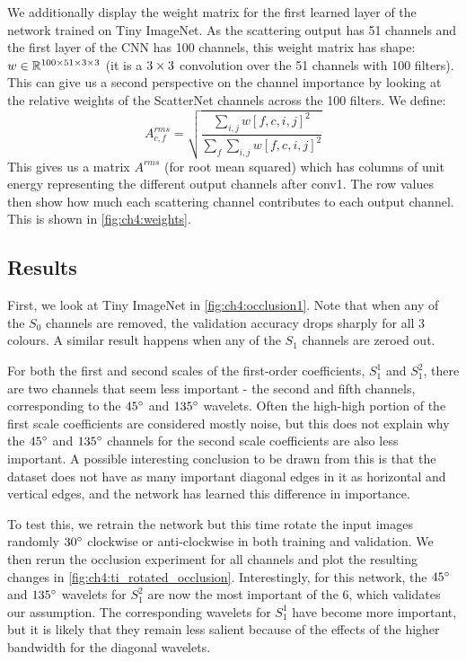We additionally display the weight matrix for the first learned layer of the
network trained on Tiny ImageNet. As the scattering output has 51 channels and
the first layer of the CNN has 100 channels, this weight matrix has shape:
$w\in \reals[100\x 51\x 3\x 3]$ (it is a $3\x 3$ convolution over the 51
channels with 100 filters). This can give us a second perspective on the
channel importance by looking at the relative weights of the ScatterNet channels
across the 100 filters. We define:
\begin{equation}\label{eq:ch4:arms}
  A^{rms}_{c, f} = \sqrt{ \frac{\sum_{i,j} w[f, c, i, j]^2}{{\sum_f \sum_{i,j} w[f, c, i, j]^2}} }
\end{equation}
This gives us a matrix $A^{rms}$ (for root mean squared) which has columns of
unit energy representing the different output channels after conv1. The row
values then show how much each scattering channel contributes to each output
channel. This is shown in \autoref{fig:ch4:weights}.

\subsection{Results}\label{sec:ch4:occlusion_results}
First, we look at Tiny ImageNet in \autoref{fig:ch4:occlusion1}.
Note that when any of the $S_0$ channels are removed, 
the validation accuracy drops sharply for all 3 colours. A similar result
happens when any of the $S_1$ channels are zeroed out. 

For both the first and second scales of the first-order coefficients, 
$S_1^1$ and $S_1^2$, there are two channels that seem less
important - the second and fifth channels, corresponding to the $45\degs$ and
$135\degs$ wavelets. Often the high-high portion of the first scale coefficients
are considered mostly noise, but this does not explain why the $45\degs$
and $135\degs$ channels for the second scale coefficients are also less
important. A possible interesting conclusion to be drawn from this is that the
dataset does not have as many important diagonal edges in it as horizontal and vertical
edges, and the network has learned this difference in importance. 

To test this, we retrain the network but this time rotate the input
images randomly $30\degs$ clockwise or anti-clockwise in both training and
validation. We then rerun the occlusion experiment for all channels and plot the
resulting changes in \autoref{fig:ch4:ti_rotated_occlusion}. Interestingly, for
this network, the $45\degs$ and $135\degs$ wavelets for $S_1^2$ are now the most
important of the 6, which validates our assumption. The corresponding wavelets
for $S_1^1$ have become more important, but it is likely that they remain less
salient because of the effects of the higher bandwidth for the diagonal
wavelets.

